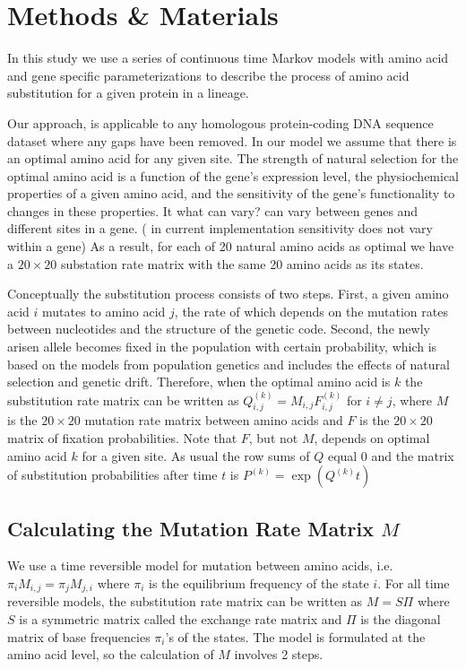 \section{Methods \& Materials}
In this study we use a series of continuous time Markov models with amino acid and gene specific parameterizations to describe the process of amino acid substitution for a given protein in a lineage. 

Our approach, is applicable to any homologous protein-coding DNA sequence dataset where any gaps have been removed.
In our model we assume that there is an optimal amino acid for any given site.
The strength of natural selection for the optimal amino acid is a function of the gene's expression level, the physiochemical properties of a given amino acid, and the sensitivity of the gene's functionality to changes in these properties.
It {\color{blue} what can vary?} can vary between genes and different sites in a gene. ({\color{blue} in current implementation sensitivity does not vary within a gene})
As a result, for each of 20 natural amino acids as optimal we have a $20 \times 20$ substation rate matrix with the same 20 amino acids as its states. 

Conceptually the substitution process consists of two steps. 
First, a given amino acid $i$ mutates to amino acid $j$, the rate of which depends on the mutation rates between nucleotides and the structure of the genetic code. 
Second, the newly arisen allele becomes fixed in the population with certain probability, which is based on the models from population genetics and includes the effects of natural selection and genetic drift. 
Therefore, when the optimal amino acid is $k$ the substitution rate matrix can be written as $Q_{i,j}^{(k)}=M_{i,j}F_{i,j}^{(k)}$ for $i \ne j$, where $M$ is the $20 \times 20$ mutation rate matrix between amino acids and $F$ is the $20 \times 20$ matrix of fixation probabilities. 
Note that $F$, but not $M$, depends on optimal amino acid $k$ for a given site. 
As usual the row sums of $Q$ equal $0$ and the matrix of substitution probabilities after time $t$ is $P^{(k)} = \exp (Q^{(k)}t)$

\subsection*{Calculating the Mutation Rate Matrix $M$}
We use a time reversible model for mutation between amino acids, i.e. $\pi_i M_{i,j} = \pi_j M_{j,i}$ where $\pi_i$ is the equilibrium frequency of the state $i$.
For all time reversible models, the substitution rate matrix can be written as $M=S\Pi$ where $S$ is a symmetric matrix called the exchange rate matrix and $\Pi$ is the diagonal matrix of base frequencies $\pi_i$'s of the states. The model is formulated at the amino acid level, so the calculation of $M$ involves 2 steps.


